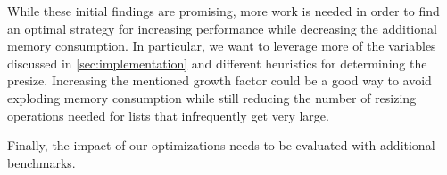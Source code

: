 \documentclass[sigconf, review, balance=false]{acmart}
\begin{document}
While these initial findings are promising, more work is needed in
order to find an optimal strategy for increasing performance while
decreasing the additional memory consumption. In particular, we want to
leverage more of the variables discussed in
\autoref{sec:implementation} and different heuristics for determining
the presize. Increasing the mentioned growth factor could be a good
way to avoid exploding memory consumption while still reducing the
number of resizing operations needed for lists that infrequently get
very large.

Finally, the impact of our optimizations needs to be evaluated with
additional benchmarks.




\end{document}
